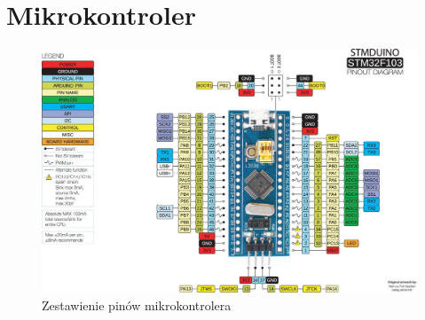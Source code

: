 \section{Mikrokontroler}

\begin{figure}
  \includegraphics[width=\textwidth]{../images/bluepill_pinout.jpg}
  \caption{Zestawienie pinów mikrokontrolera}
\end{figure}
